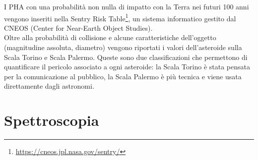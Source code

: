\documentclass[a4paper,11pt,openright]{book}
\begin{document}
I PHA con una probabilità non nulla di impatto con la Terra nei futuri 100 anni vengono inseriti nella Sentry Risk Table\footnote{\href {https://cneos.jpl.nasa.gov/sentry/}{https://cneos.jpl.nasa.gov/sentry/} }, un sistema informatico gestito dal CNEOS (Center for Near-Earth Object Studies).\\
Oltre alla probabilità di collisione e alcune caratteristiche dell’oggetto (magnitudine assoluta, diametro) vengono riportati i valori dell’asteroide sulla Scala Torino e Scala Palermo. Queste sono due classificazioni che permettono di quantificare il pericolo associato a ogni asteroide: la Scala Torino è stata pensata per la comunicazione al pubblico, la Scala Palermo è più tecnica e viene usata direttamente dagli astronomi.


\chapter{Spettroscopia}\label{ch:ch_2}
\end{document}
